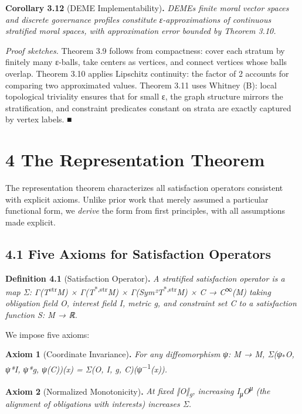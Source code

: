 \documentclass[12pt]{article}
\theoremstyle{plain}
\theoremstyle{definition}
\theoremstyle{remark}
\begin{document}
\textbf{Corollary 3.12} (DEME Implementability)\textbf{.}
\emph{DEME\textquotesingle s finite moral vector spaces and discrete
governance profiles constitute ε-approximations of continuous stratified
moral spaces, with approximation error bounded by Theorem 3.10.}

\emph{Proof sketches.} Theorem 3.9 follows from compactness: cover each
stratum by finitely many ε-balls, take centers as vertices, and connect
vertices whose balls overlap. Theorem 3.10 applies Lipschitz continuity:
the factor of 2 accounts for comparing two approximated values. Theorem
3.11 uses Whitney (B): local topological triviality ensures that for
small ε, the graph structure mirrors the stratification, and constraint
predicates constant on strata are exactly captured by vertex labels. ■

\section{4 The Representation Theorem}\label{the-representation-theorem}

The representation theorem characterizes all satisfaction operators
consistent with explicit axioms. Unlike prior work that merely assumed a
particular functional form, we \emph{derive} the form from first
principles, with all assumptions made explicit.

\subsection{4.1 Five Axioms for Satisfaction
Operators}\label{five-axioms-for-satisfaction-operators}

\textbf{Definition 4.1} (Satisfaction Operator)\textbf{.} \emph{A
stratified satisfaction operator is a map Σ:
Γ(T}\textsuperscript{str}\emph{M) × Γ(T}\textsuperscript{*,str}\emph{M)
× Γ(Sym²T}\textsuperscript{*,str}\emph{M) × C →
C}\textsuperscript{∞}\emph{(M) taking obligation field O, interest field
I, metric g, and constraint set C to a satisfaction function S: M → ℝ.}

We impose five axioms:

\textbf{Axiom 1} (Coordinate Invariance)\textbf{.} \emph{For any
diffeomorphism ψ: M → M, Σ(ψ}\textsubscript{*}\emph{O, ψ*I, ψ*g,
ψ(C))(x) = Σ(O, I, g, C)(ψ}\textsuperscript{−1}\emph{(x)).}

\textbf{Axiom 2} (Normalized Monotonicity)\textbf{.} \emph{At fixed
‖O‖\textsubscript{g}, increasing I\textsubscript{μ}O\textsuperscript{μ}
(the alignment of obligations with interests) increases Σ.}
\end{document}
